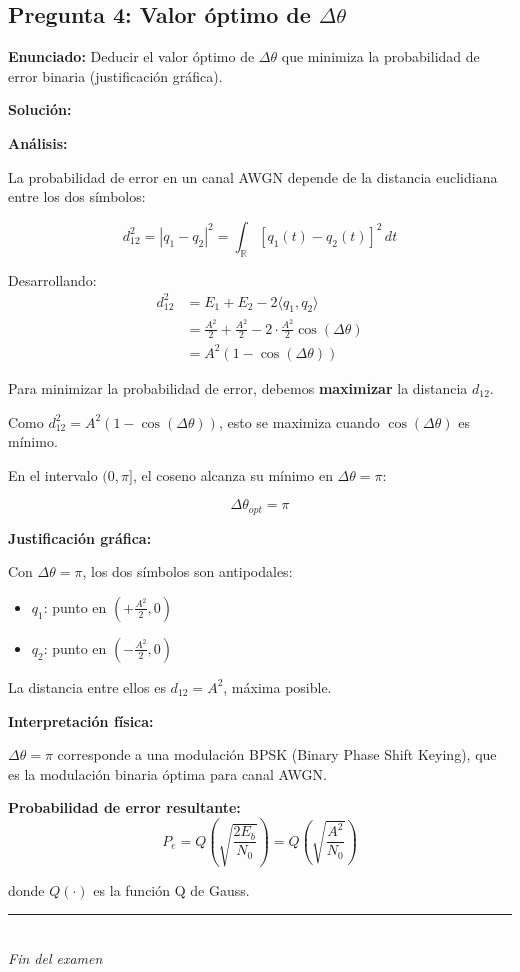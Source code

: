 \documentclass[11pt,a4paper]{article}
\begin{document}
\subsection*{Pregunta 4: Valor \'optimo de $\Delta\theta$}

\textbf{Enunciado:} Deducir el valor \'optimo de $\Delta\theta$ que minimiza la probabilidad de error binaria (justificaci\'on gr\'afica).

\vspace{0.3cm}
\textbf{Soluci\'on:}

\textbf{An\'alisis:}

La probabilidad de error en un canal AWGN depende de la distancia euclidiana entre los dos s\'imbolos:

\[
d_{12}^2 = |q_1 - q_2|^2 = \int_{\mathbb{R}} [q_1(t) - q_2(t)]^2\, dt
\]

Desarrollando:
\begin{align*}
d_{12}^2 &= E_1 + E_2 - 2\langle q_1, q_2 \rangle \\
&= \frac{A^2}{2} + \frac{A^2}{2} - 2 \cdot \frac{A^2}{2}\cos(\Delta\theta) \\
&= A^2(1 - \cos(\Delta\theta))
\end{align*}

Para minimizar la probabilidad de error, debemos \textbf{maximizar} la distancia $d_{12}$.

Como $d_{12}^2 = A^2(1 - \cos(\Delta\theta))$, esto se maximiza cuando $\cos(\Delta\theta)$ es m\'inimo.

En el intervalo $(0, \pi]$, el coseno alcanza su m\'inimo en $\Delta\theta = \pi$:

\[
\boxed{\Delta\theta_{opt} = \pi}
\]

\textbf{Justificaci\'on gr\'afica:}

Con $\Delta\theta = \pi$, los dos s\'imbolos son antipodales:
\begin{itemize}
    \item $q_1$: punto en $(+\frac{A^2}{2}, 0)$
    \item $q_2$: punto en $(-\frac{A^2}{2}, 0)$
\end{itemize}

La distancia entre ellos es $d_{12} = A^2$, m\'axima posible.

\textbf{Interpretaci\'on f\'isica:}

$\Delta\theta = \pi$ corresponde a una modulaci\'on BPSK (Binary Phase Shift Keying), que es la modulaci\'on binaria \'optima para canal AWGN.

\textbf{Probabilidad de error resultante:}
\[
P_e = Q\left(\sqrt{\frac{2E_b}{N_0}}\right) = Q\left(\sqrt{\frac{A^2}{N_0}}\right)
\]

donde $Q(\cdot)$ es la funci\'on Q de Gauss.



\vspace{1cm}
\begin{center}
\rule{0.8\linewidth}{0.4pt}\\
\textit{Fin del examen}
\end{center}
\end{document}
